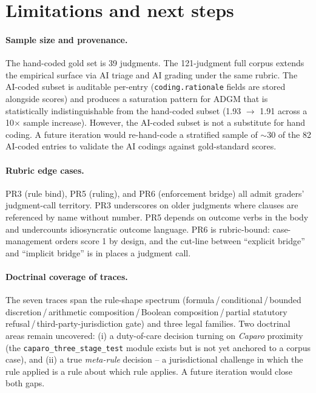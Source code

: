 \documentclass[11pt,letterpaper]{article}
\begin{document}
\section{Limitations and next steps}

\paragraph{Sample size and provenance.} The hand-coded gold set is 39 judgments. The 121-judgment full corpus extends the empirical surface via AI triage and AI grading under the same rubric. The AI-coded subset is auditable per-entry (\texttt{coding.rationale} fields are stored alongside scores) and produces a saturation pattern for ADGM that is statistically indistinguishable from the hand-coded subset (1.93 $\to$ 1.91 across a 10$\times$ sample increase). However, the AI-coded subset is not a substitute for hand coding. A future iteration would re-hand-code a stratified sample of $\sim$30 of the 82 AI-coded entries to validate the AI codings against gold-standard scores.

\paragraph{Rubric edge cases.} PR3 (rule bind), PR5 (ruling), and PR6 (enforcement bridge) all admit graders' judgment-call territory. PR3 underscores on older judgments where clauses are referenced by name without number. PR5 depends on outcome verbs in the body and undercounts idiosyncratic outcome language. PR6 is rubric-bound: case-management orders score 1 by design, and the cut-line between ``explicit bridge'' and ``implicit bridge'' is in places a judgment call.

\paragraph{Doctrinal coverage of traces.} The seven traces span the rule-shape spectrum (formula\,/\,conditional\,/\,bounded discretion\,/\,arithmetic composition\,/\,Boolean composition\,/\,partial statutory refusal\,/\,third-party-jurisdiction gate) and three legal families. Two doctrinal areas remain uncovered: (i) a duty-of-care decision turning on \textit{Caparo} proximity (the \texttt{caparo\_three\_stage\_test} module exists but is not yet anchored to a corpus case), and (ii) a true \textit{meta-rule} decision -- a jurisdictional challenge in which the rule applied is a rule about which rule applies. A future iteration would close both gaps.
\end{document}
